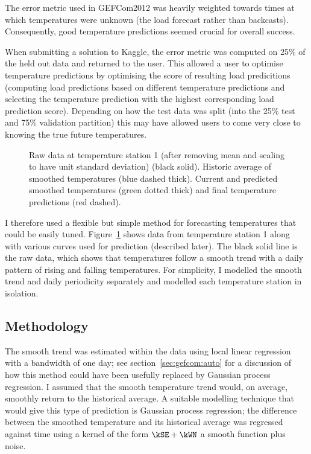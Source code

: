 The error metric used in GEFCom2012 was heavily weighted towards times at which temperatures were unknown (\ie the load forecast rather than backcasts).
Consequently, good temperature predictions seemed crucial for overall success.

When submitting a solution to Kaggle, the error metric was computed on 25\% of the held out data and returned to the user.
This allowed a user to optimise temperature predictions by optimising the score of resulting load predicitions (\ie computing load predictions based on different temperature predictions and selecting the temperature prediction with the highest corresponding load prediction score).
Depending on how the test data was split (into the 25\% test and 75\% validation partition) this may have allowed users to come very close to knowing the true future temperatures.

\begin{figure}[ht]
  \begin{center}
    
  \end{center}
  \caption{Raw data at temperature station 1 (after removing mean and scaling to have unit standard deviation) (black solid). Historic average of smoothed temperatures (blue dashed thick). Current and predicted smoothed temperatures (green dotted thick) and final temperature predictions (red dashed).}
  \label{fig:temp_pred}
\end{figure}

I therefore used a flexible but simple method for forecasting temperatures that could be easily tuned.
Figure~\ref{fig:temp_pred} shows data from temperature station 1 along with various curves used for prediction (described later).
The black solid line is the raw data, which shows that temperatures follow a smooth trend with a daily pattern of rising and falling temperatures.
For simplicity, I modelled the smooth trend and daily periodicity separately and modelled each temperature station in isolation.

\subsection{Methodology}

The smooth trend was estimated within the data using local linear regression \citep[e.g. chapter 6 of][]{Hastie2009-hj} with a bandwidth of one day; see section~\ref{sec:gefcom:auto} for a discussion of how this method could have been usefully replaced by Gaussian process regression.
I assumed that the smooth temperature trend would, on average, smoothly return to the historical average.
A suitable modelling technique that would give this type of prediction is Gaussian process regression; the difference between the smoothed temperature and its historical average was regressed against time using a kernel of the form $\kSE + \kWN$ \ie a smooth function plus noise.


